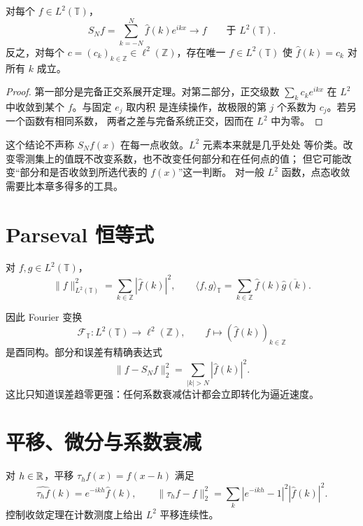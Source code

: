 \begin{theorem}
\label{thm:l2-fourier-convergence}
对每个 \(f\in L^2(\mathbb T)\)，
\[
 S_Nf=\sum_{k=-N}^{N}\widehat f(k)e^{ikx}
 \longrightarrow f\qquad\text{于 }L^2(\mathbb T).
\]
反之，对每个 \(c=(c_k)_{k\in\mathbb Z}\in\ell^2(\mathbb Z)\)，存在唯一
\(f\in L^2(\mathbb T)\) 使 \(\widehat f(k)=c_k\) 对所有 \(k\) 成立。
\end{theorem}
\begin{proof}
第一部分是完备正交系展开定理。对第二部分，正交级数
\(\sum_kc_ke^{ikx}\) 在 \(L^2\) 中收敛到某个 \(f\)。与固定 \(e_j\) 取内积
是连续操作，故极限的第 \(j\) 个系数为 \(c_j\)。若另一个函数有相同系数，
两者之差与完备系统正交，因而在 \(L^2\) 中为零。
\end{proof}

这个结论不声称 \(S_Nf(x)\) 在每一点收敛。\(L^2\) 元素本来就是几乎处处
等价类。改变零测集上的值既不改变系数，也不改变任何部分和在任何点的值；
但它可能改变“部分和是否收敛到所选代表的 \(f(x)\)”这一判断。
对一般 \(L^2\) 函数，点态收敛需要比本章多得多的工具。

\section{Parseval 恒等式}

\begin{corollary}\label{thm:fourier-parseval-circle}
对 \(f,g\in L^2(\mathbb T)\)，
\[
 \|f\|_{L^2(\mathbb T)}^2=\sum_{k\in\mathbb Z}|\widehat f(k)|^2,
 \qquad
 \langle f,g\rangle_{\mathbb T}
 =\sum_{k\in\mathbb Z}\widehat f(k)\overline{\widehat g(k)}.
\]
\end{corollary}

因此 Fourier 变换
\[
 \mathcal F_{\mathbb T}:L^2(\mathbb T)\to\ell^2(\mathbb Z),
 \qquad f\mapsto(\widehat f(k))_{k\in\mathbb Z}
\]
是酉同构。部分和误差有精确表达式
\begin{equation}\label{eq:l2-fourier-tail}
 \|f-S_Nf\|_2^2=\sum_{|k|>N}|\widehat f(k)|^2.
\end{equation}
这比只知道误差趋零更强：任何系数衰减估计都会立即转化为逼近速度。

\section{平移、微分与系数衰减}

对 \(h\in\mathbb{R}\)，平移 \(\tau_hf(x)=f(x-h)\) 满足
\[
 \widehat{\tau_hf}(k)=e^{-ikh}\widehat f(k),\qquad
 \|\tau_hf-f\|_2^2
 =\sum_k|e^{-ikh}-1|^2|\widehat f(k)|^2.
\]
控制收敛定理在计数测度上给出 \(L^2\) 平移连续性。

